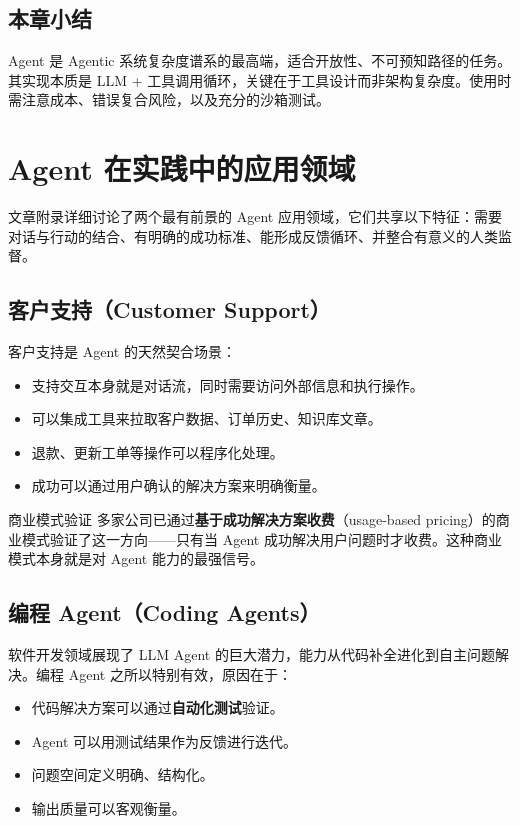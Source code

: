 \documentclass[a4paper]{article}
\begin{document}
\subsection{本章小结}
Agent 是 Agentic 系统复杂度谱系的最高端，适合开放性、不可预知路径的任务。其实现本质是 LLM + 工具调用循环，关键在于工具设计而非架构复杂度。使用时需注意成本、错误复合风险，以及充分的沙箱测试。


\section{Agent 在实践中的应用领域}

文章附录详细讨论了两个最有前景的 Agent 应用领域，它们共享以下特征：需要对话与行动的结合、有明确的成功标准、能形成反馈循环、并整合有意义的人类监督。

\subsection{客户支持（Customer Support）}

客户支持是 Agent 的天然契合场景：

\begin{itemize}
    \item 支持交互本身就是对话流，同时需要访问外部信息和执行操作。
    \item 可以集成工具来拉取客户数据、订单历史、知识库文章。
    \item 退款、更新工单等操作可以程序化处理。
    \item 成功可以通过用户确认的解决方案来明确衡量。
\end{itemize}

\begin{knowledgebox}{商业模式验证}
多家公司已通过\textbf{基于成功解决方案收费}（usage-based pricing）的商业模式验证了这一方向——只有当 Agent 成功解决用户问题时才收费。这种商业模式本身就是对 Agent 能力的最强信号。
\end{knowledgebox}

\subsection{编程 Agent（Coding Agents）}

软件开发领域展现了 LLM Agent 的巨大潜力，能力从代码补全进化到自主问题解决。编程 Agent 之所以特别有效，原因在于：

\begin{itemize}
    \item 代码解决方案可以通过\textbf{自动化测试}验证。
    \item Agent 可以用测试结果作为反馈进行迭代。
    \item 问题空间定义明确、结构化。
    \item 输出质量可以客观衡量。
\end{itemize}
\end{document}
